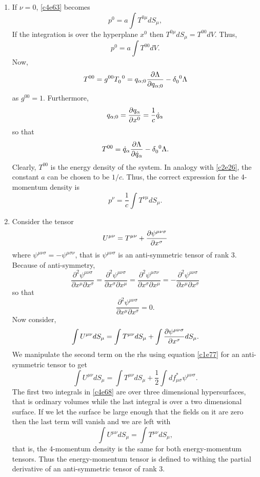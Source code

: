 \begin{enumerate}
\item If $\nu = 0$, \eqref{c4e63} becomes
\[
p^0 = a\int T^{0\mu}dS_\mu,
\]
If the integration is over the hyperplane $x^0$ then $T^{0\mu}dS_\mu = 
T^{00}dV$. Thus,
\[
p^0 = a\int T^{00}dV.
\]
Now, 
\[
T^{00} = g^{00}\tensor{T}{_0^0} = q_{\alpha;0}\pdt{\Lambda}{q_{\alpha;0}} - 
\tensor{\delta}{_0^0} \Lambda
\]
as $g^{00} = 1$. Furthermore, 
\[
q_{\alpha; 0} = \frac{\partial{q_\alpha}}{\partial{x^0}} = \frac{1}{c}\dot{q}_\alpha
\]
so that
\[
T^{00} = \dot{q}_\alpha\pdt{\Lambda}{\dot{q}_\alpha} - 
\tensor{\delta}{_0^0} \Lambda.
\]
Clearly, $T^{00}$ is the energy density of the system. In analogy with 
\eqref{c2e26}, the constant $a$ can be chosen to be $1/c$. Thus, the correct 
expression for the 4-momentum density is
\begin{equation}\label{c4e64}
p^\nu = \frac{1}{c}\int T^{\nu\mu}dS_\mu.
\end{equation}

\item Consider the tensor
\begin{equation}\label{c4e65}
U^{\mu\nu} = T^{\mu\nu} + \frac{\partial{\psi^{\mu\nu\sigma}}}{\partial{x^\sigma}}
\end{equation}
where $\psi^{\mu\nu\sigma}=-\psi^{\mu\sigma\nu}$, that is $\psi^{\mu\nu\sigma}$
is an anti-symmetric tensor of rank 3. Because of anti-symmetry,
\[
\frac{\partial^2\psi^{\mu\nu\sigma}}{\partial x^\mu \partial x^\sigma} = 
\frac{\partial^2\psi^{\mu\nu\sigma}}{\partial x^\sigma \partial x^\mu} = 
\frac{\partial^2\psi^{\mu\sigma\nu}}{\partial x^\sigma \partial x^\mu} = 
-\frac{\partial^2\psi^{\mu\nu\sigma}}{\partial x^\mu \partial x^\sigma}
\]
so that
\begin{equation}\label{c4e66}
\frac{\partial^2\psi^{\mu\nu\sigma}}{\partial x^\mu \partial x^\sigma} = 0.
\end{equation}
Now consider,
\begin{equation}\label{c4e67}
\int U^{\mu\nu} dS_\mu = \int T^{\mu\nu} dS_\mu + 
\int\frac{\partial{\psi^{\mu\nu\sigma}}}{\partial{x^\sigma}} dS_\mu.
\end{equation}
We manipulate the second term on the rhs using equation \eqref{c1e77} for an 
anti-symmetric tensor to get
\begin{equation}\label{c4e68}
\int U^{\mu\nu} dS_\mu = \int T^{\mu\nu} dS_\mu + 
\frac{1}{2}\int df^\ast_{\mu\sigma}\psi^{\mu\nu\sigma}.
\end{equation}
The first two integrals in \eqref{c4e68} are over three dimensional 
hypersurfaces, that is ordinary volumes while the last integral is over a two 
dimensional surface. If we let the surface be large enough that the fields on 
it are zero then the last term will vanish and we are left with
\begin{equation}\label{c4e69}
\int U^{\mu\nu} dS_\mu = \int T^{\mu\nu} dS_\mu,
\end{equation}
that is, the 4-momentum density is the same for both energy-momentum tensors. 
Thus the energy-momentum tensor is defined to withing the partial derivative of 
an anti-symmetric tensor of rank 3.


\end{enumerate}

